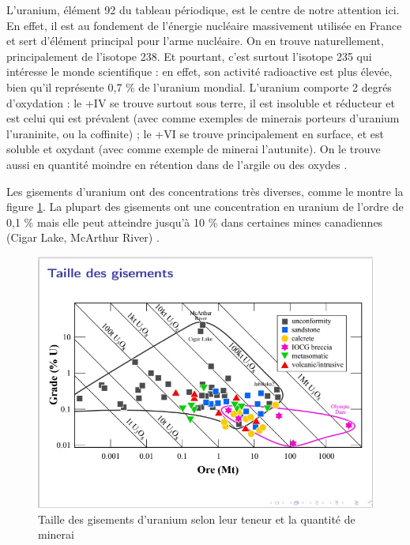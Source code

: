 \documentclass{article}
\begin{document}
L’uranium, élément 92 du tableau périodique, est le centre de notre attention ici. En effet, il est au fondement de l’énergie nucléaire massivement utilisée en France et sert d’élément principal pour l’arme nucléaire. On en trouve naturellement, principalement de l’isotope 238. Et pourtant, c’est surtout l’isotope 235 qui intéresse le monde scientifique : en effet, son activité radioactive est plus élevée, bien qu'il représente 0,7 \% de l’uranium mondial. L'uranium comporte 2 degrés d’oxydation : le +IV se trouve surtout sous terre, il est insoluble et réducteur et est celui qui est prévalent (avec comme exemples de minerais porteurs d'uranium l'uraninite, ou la coffinite) ; le +VI se trouve principalement en surface, et est soluble et oxydant (avec comme exemple de minerai l'autunite). On le trouve aussi en quantité moindre en rétention dans de l’argile ou des oxydes \cite{descostes_introduction_2020}.

Les gisements d’uranium ont des concentrations très diverses, comme le montre la figure \ref{fig:gisements_uranium}. La plupart des gisements ont une concentration en uranium de l’ordre de 0,1 \% mais elle peut atteindre jusqu’à 10 \% dans certaines mines canadiennes (Cigar Lake, McArthur River) \cite{raimbault_mine_2020}.


\begin{figure}[H]
    \centering
    \includegraphics[width = \linewidth]{I_A_1.jpg}
    \caption{Taille des gisements d'uranium selon leur teneur et la quantité de minerai \cite{raimbault_mine_2020}}
    \label{fig:gisements_uranium}
\end{figure}
\end{document}
